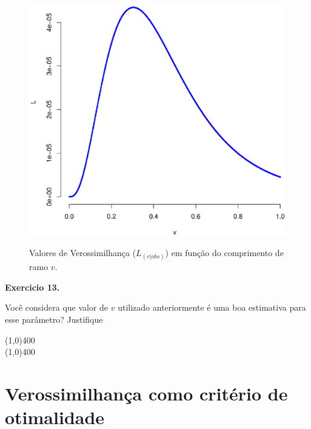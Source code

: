 \begin{refsection}
  \begin{figure}[h!]
      {\includegraphics[scale=0.55]{figures/tut12/plot_3.eps}}
      {\caption{Valores de Verossimilhança ($L_{(v|obs)}$) em função do comprimento de ramo $v$.}\label{fig:plot3}}
  \end{figure}


\begin{blackBlock}{\textbf{Exercicio 13.}}\label{tut12:ex:13.3}

Você considera que valor de $v$ utilizado anteriormente é uma boa estimativa para esse parâmetro? Justifique

\end{blackBlock}

\begin{center}
\line(1,0){400}\\
\line(1,0){400}\\
\end{center}


\section{Verossimilhança como critério de otimalidade} \label{tut12:first_sec}


\end{refsection}

